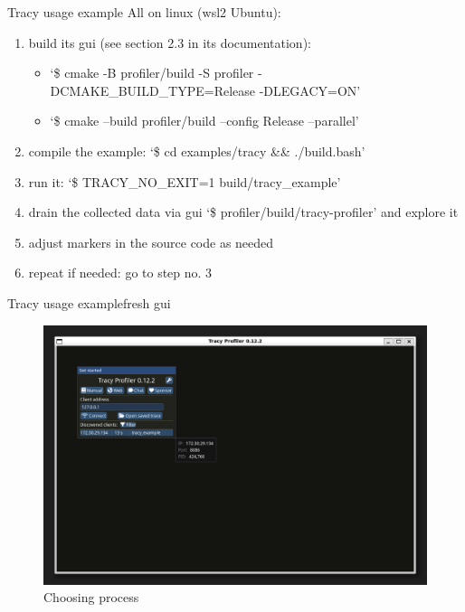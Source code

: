 \documentclass[aspectratio=169]{beamer}
\begin{document}
\begin{frame}{Tracy usage example}
    All on linux (wsl2 Ubuntu):

    \begin{enumerate}
        \item build its gui (see section 2.3 in its documentation):
        \begin{itemize}
            \item `\$ cmake -B profiler/build -S profiler -DCMAKE\_BUILD\_TYPE=Release -DLEGACY=ON'
            \item `\$ cmake --build profiler/build --config Release --parallel'
        \end{itemize}
        \item compile the example: `\$ cd examples/tracy \&\& ./build.bash'
        \item run it: `\$ TRACY\_NO\_EXIT=1 build/tracy\_example'
        \item drain the collected data via gui `\$ profiler/build/tracy-profiler' and explore it
        \item adjust markers in the source code as needed
        \item repeat if needed: go to step no. 3
    \end{enumerate}

\end{frame}

\begin{frame}{Tracy usage example}{fresh gui}
    \begin{figure}[h]
        \centering
        \includegraphics[width=\textwidth,height=0.7\textheight,keepaspectratio]{pics/tracy/gui1.png}
        \caption{Choosing process}
    \end{figure}

\end{frame}
\end{document}
